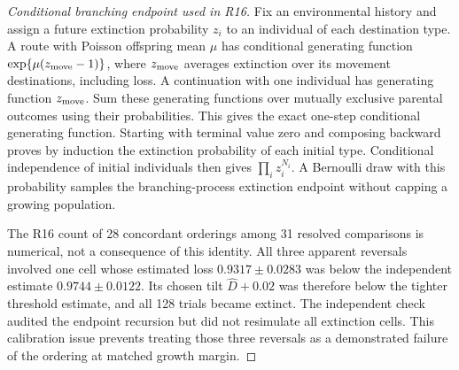 \begin{proof}[Conditional branching endpoint used in R16]
Fix an environmental history and assign a future extinction probability \(z_i\) to an individual of each destination type. A route with Poisson offspring mean \(\mu\) has conditional generating function \(\exp\{\mu(z_{\rm move}-1)\}\), where \(z_{\rm move}\) averages extinction over its movement destinations, including loss. A continuation with one individual has generating function \(z_{\rm move}\). Sum these generating functions over mutually exclusive parental outcomes using their probabilities. This gives the exact one-step conditional generating function. Starting with terminal value zero and composing backward proves by induction the extinction probability of each initial type. Conditional independence of initial individuals then gives \(\prod_i z_i^{N_i}\). A Bernoulli draw with this probability samples the branching-process extinction endpoint without capping a growing population.

The R16 count of 28 concordant orderings among 31 resolved comparisons is numerical, not a consequence of this identity. All three apparent reversals involved one cell whose estimated loss \(0.9317\pm0.0283\) was below the independent estimate \(0.9744\pm0.0122\). Its chosen tilt \(\widehat D+0.02\) was therefore below the tighter threshold estimate, and all 128 trials became extinct. The independent check audited the endpoint recursion but did not resimulate all extinction cells. This calibration issue prevents treating those three reversals as a demonstrated failure of the ordering at matched growth margin.
\end{proof}

